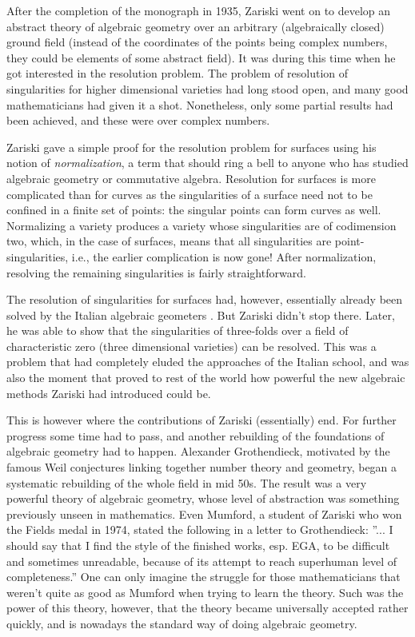 \documentclass[12pt,a4paper,leqno]{article}
\theoremstyle{plain}
\theoremstyle{definition}
\theoremstyle{remark}
\begin{document}
After the completion of the monograph in 1935, Zariski went on to develop an abstract theory of algebraic geometry over an arbitrary (algebraically closed) ground field (instead of the coordinates of the points being complex numbers, they could be elements of some abstract field). It was during this time when he got interested in the resolution problem. The problem of resolution of singularities for higher dimensional varieties had long stood open, and many good mathematicians had given it a shot. Nonetheless, only some partial results had been achieved, and these were over complex numbers.

Zariski gave a simple proof for the resolution problem for surfaces using his notion of \emph{normalization}, a term that should ring a bell to anyone who has studied algebraic geometry or commutative algebra. Resolution for surfaces is more complicated than for curves as the singularities of a surface need not to be confined in a finite set of points: the singular points can form curves as well. Normalizing a variety produces a variety whose singularities are of codimension two, which, in the case of surfaces, means that all singularities are point-singularities, i.e., the earlier complication is now gone! After normalization, resolving the remaining singularities is fairly straightforward.

The resolution of singularities for surfaces had, however, essentially already been solved by the Italian algebraic geometers \cite{Par}. But Zariski didn't stop there. Later, he was able to show that the singularities of three-folds over a field of characteristic zero (three dimensional varieties) can be resolved. This was a problem that had completely eluded the approaches of the Italian school, and was also the moment that proved to rest of the world how powerful the new algebraic methods Zariski had introduced could be.

This is however where the contributions of Zariski (essentially) end. For further progress some time had to pass, and another rebuilding of the foundations of algebraic geometry had to happen. Alexander Grothendieck, motivated by the famous Weil conjectures linking together number theory and geometry, began a systematic rebuilding of the whole field in mid 50s. The result was a very powerful theory of algebraic geometry, whose level of abstraction was something previously unseen in mathematics. Even Mumford, a student of Zariski who won the Fields medal in 1974, stated the following in a letter to Grothendieck: ''... I should say that I find the style of the finished works, esp. EGA, to be difficult and sometimes unreadable, because of its attempt to reach superhuman level of completeness.'' \cite{Mum} One can only imagine the struggle for those mathematicians that weren't quite as good as Mumford when trying to learn the theory. Such was the power of this theory, however, that the theory became universally accepted rather quickly, and is nowadays the standard way of doing algebraic geometry.
\end{document}
